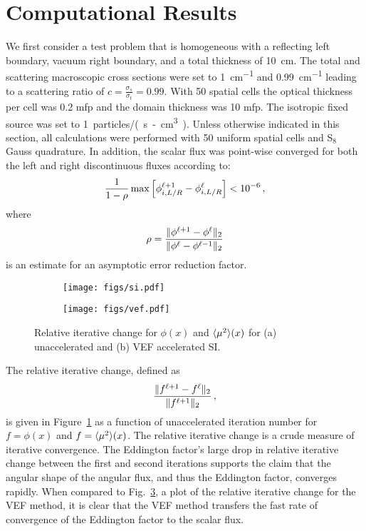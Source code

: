 
\section{Computational Results}


We first consider a test problem that is homogeneous with a reflecting left boundary, vacuum right boundary, and a total thickness of \SI{10}{cm}.  The total and scattering macroscopic cross sections were set to \SI{1}{cm^{-1}} and 
\SI{0.99}{cm^{-1}} leading to a scattering ratio of $c = \frac{\sigma_s}{\sigma_t}=0.99$. With 50 spatial cells the optical thickness per cell was 0.2 mfp and the domain thickness was 10 mfp. The isotropic fixed source was set to \SI{1}{particles/(s-cm^3)}. 
Unless otherwise indicated in this section, all calculations were performed with 50 uniform spatial cells and S$_8$ Gauss quadrature. In addition, the scalar flux was point-wise converged for both the left and right discontinuous fluxes according to:
	\begin{equation} 
		\frac{1}{1 - \rho}\max\left[ \phi_{i,L/R}^{\ell+1} - \phi_{i,L/R}^\ell \right] < \num{e-6} \,,
	\end{equation}
where 
	\begin{equation}
		\rho = \frac{\| \phi^{\ell+1} - \phi^\ell \|_2}{\| \phi^\ell - \phi^{\ell-1} \|_2}
	\end{equation}
is an estimate for an asymptotic error reduction factor.

\begin{figure}[htb]
\centering
\begin{subfigure}{.515\textwidth}
	\centering
	\texttt{[image: figs/si.pdf]}
	\caption{}
	\label{fig:si}
\end{subfigure}
\hspace{-2em}
\begin{subfigure}{.515\textwidth}
	\centering
	\texttt{[image: figs/vef.pdf]}  
	\caption{}
	\label{fig:vef}
\end{subfigure}
\caption{Relative iterative change for $\phi(x)$ and $\langle \mu^2 \rangle(x)$ for (a) unaccelerated and (b) VEF accelerated SI. }
\end{figure}

The relative iterative change, defined as 
	\begin{equation}
		\frac{\| f^{\ell+1} - f^\ell \|_2}{\| f^{\ell+1} \|_2 } \,,
	\end{equation}	
is given in Figure~\ref{fig:si} as a function of unaccelerated iteration number for $f = \phi(x)$ and $f = \langle \mu^2 \rangle(x)$. The relative iterative change is a crude measure of iterative convergence.  The Eddington factor's large drop in relative 
iterative change between the first and second iterations supports the claim that the angular shape of the angular flux, and thus the Eddington factor, converges rapidly. When compared to Fig.~\ref{fig:vef}, a plot of the relative iterative change for the VEF method, it is clear that the VEF method transfers the fast rate of convergence of the Eddington factor to the scalar flux. 

